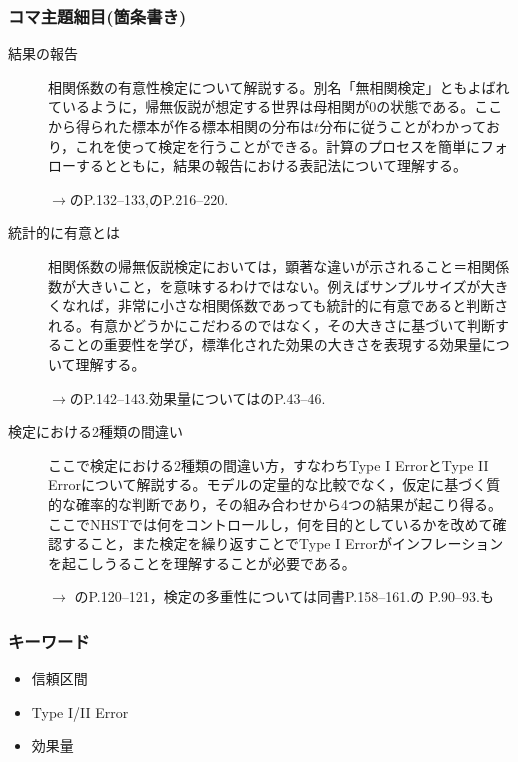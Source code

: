 \subsubsection{コマ主題細目(箇条書き)}
\begin{description}
\item[結果の報告]相関係数の有意性検定について解説する。別名「無相関検定」ともよばれているように，帰無仮説が想定する世界は母相関が0の状態である。ここから得られた標本が作る標本相関の分布は$t$分布に従うことがわかっており，これを使って検定を行うことができる。計算のプロセスを簡単にフォローするとともに，結果の報告における表記法について理解する。
\begin{flushright}
    $\to$\citet{Yamada2004}のP.132--133,\citet{山内201001}のP.216--220.
\end{flushright}

\item[統計的に有意とは]相関係数の帰無仮説検定においては，顕著な違いが示されること＝相関係数が大きいこと，を意味するわけではない。例えばサンプルサイズが大きくなれば，非常に小さな相関係数であっても統計的に有意であると判断される。有意かどうかにこだわるのではなく，その大きさに基づいて判断することの重要性を学び，標準化された効果の大きさを表現する効果量について理解する。
\begin{flushright}
    $\to$\citet{Yamada2004}のP.142--143.効果量については\citet{大久保201201}のP.43--46.
\end{flushright}

\item[検定における2種類の間違い]ここで検定における2種類の間違い方，すなわちType I ErrorとType II Errorについて解説する。モデルの定量的な比較でなく，仮定に基づく質的な確率的な判断であり，その組み合わせから4つの結果が起こり得る。ここでNHSTでは何をコントロールし，何を目的としているかを改めて確認すること，また検定を繰り返すことでType I Errorがインフレーションを起こしうることを理解することが必要である。
\begin{flushright}
    $\to$ \citet{Yamada2004}のP.120--121，検定の多重性については同書P.158--161.\citet{川端201408}の P.90--93.も
\end{flushright}

\end{description}
\subsubsection{キーワード}
\begin{itemize}
\item 信頼区間
\item Type I/II Error
\item 効果量
\end{itemize}
